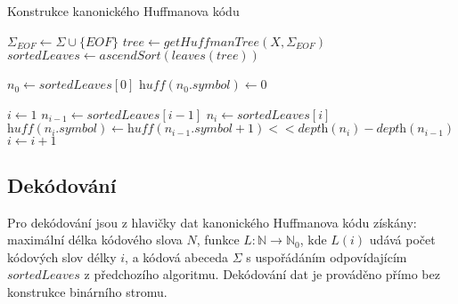 \documentclass[a4paper, 11pt, fleqn]{scrartcl}
\begin{document}
        \enlargethispage{1\baselineskip}

        \vspace*{-1.2cm}
        \begin{algorithm}[!h]
          \SetAlgoLined
          \DontPrintSemicolon
          \caption{Konstrukce kanonického Huffmanova kódu}

          $\Sigma_{EOF} \leftarrow \Sigma \cup \{\textit{EOF}\}$\;
          $\textit{tree} \leftarrow \textit{getHuffmanTree}(X, \Sigma_{EOF})$\;
          $\textit{sortedLeaves} \leftarrow \textit{ascendSort}(\textit{leaves}(\textit{tree}))$

          $n_0 \leftarrow \textit{sortedLeaves}[0]$\;
          $\textit{huff}(n_0.symbol) \leftarrow 0$\;


          $i \leftarrow 1$\;
          {
            $n_{i-1} \leftarrow \textit{sortedLeaves}[i-1]$\;
            $n_i \leftarrow \textit{sortedLeaves}[i]$\;
            $\textit{huff}(n_i.symbol) \leftarrow \textit{huff}(n_{i-1}.symbol + 1) << \textit{depth}(n_i) - \textit{depth}(n_{i-1})$\;
            $i \leftarrow i+1$\;
          }



        \end{algorithm}

      \vspace*{-0.2cm}

      \subsection*{Dekódování}
        Pro dekódování jsou z hlavičky dat kanonického Huffmanova kódu získány: maximální délka kódového slova $N$, funkce $L: \mathbb{N} \rightarrow \mathbb{N}_0$, kde $L(i)$ udává počet kódových slov délky $i$, a kódová abeceda $\Sigma$ s uspořádáním odpovídajícím $\textit{sortedLeaves}$ z předchozího algoritmu. Dekódování dat je prováděno přímo bez konstrukce binárního stromu.
\end{document}
